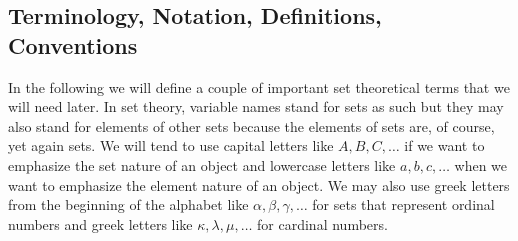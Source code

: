 


\subsection{Terminology, Notation, Definitions, Conventions}
In the following we will define a couple of important set theoretical terms that we will need later. In set theory, variable names stand for sets as such but they may also stand for elements of other sets because the elements of sets are, of course, yet again sets. We will tend to use capital letters like $A,B,C,\ldots$ if we want to emphasize the set nature of an object and lowercase letters like $a,b,c,\ldots$ when we want to emphasize the element nature of an object. We may also use greek letters from the beginning of the alphabet like $\alpha,\beta,\gamma, \ldots$ for sets that represent ordinal numbers and greek letters like $\kappa,\lambda,\mu,\ldots$ for cardinal numbers.






